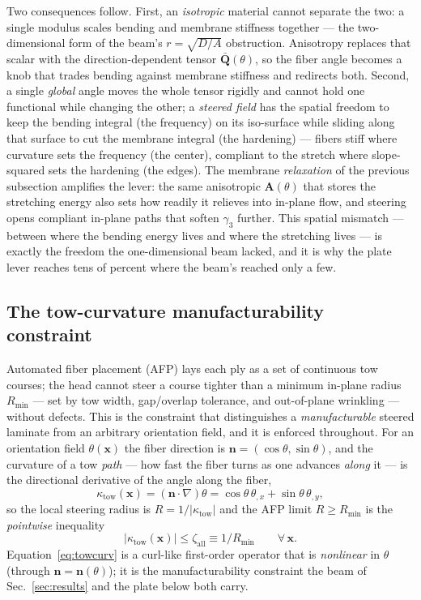 \documentclass[11pt]{article}
\newcommand{\zall}{\zeta_{\mathrm{all}}}
\begin{document}
Two consequences follow. First, an \emph{isotropic} material cannot separate the
two: a single modulus scales bending and membrane stiffness together --- the
two-dimensional form of the beam's $r=\sqrt{D/A}$ obstruction. Anisotropy
replaces that scalar with the direction-dependent tensor $\bar{\bm Q}(\theta)$,
so the fiber angle becomes a knob that trades bending against membrane stiffness
and redirects both. Second, a single \emph{global} angle moves the whole tensor
rigidly and cannot hold one functional while changing the other; a \emph{steered
field} has the spatial freedom to keep the bending integral (the frequency) on
its iso-surface while sliding along that surface to cut the membrane integral
(the hardening) --- fibers stiff where curvature sets the frequency (the center),
compliant to the stretch where slope-squared sets the hardening (the edges). The
membrane \emph{relaxation} of the previous subsection amplifies the lever: the
same anisotropic $\bm A(\theta)$ that stores the stretching energy also sets how
readily it relieves into in-plane flow, and steering opens compliant in-plane
paths that soften $\gamma_3$ further. This spatial mismatch --- between where the
bending energy lives and where the stretching lives --- is exactly the freedom the
one-dimensional beam lacked, and it is why the plate lever reaches tens of
percent where the beam's reached only a few.

\subsection{The tow-curvature manufacturability constraint}\label{sec:manuf}
Automated fiber placement (AFP) lays each ply as a set of continuous tow courses; the
head cannot steer a course tighter than a minimum in-plane radius $R_{\min}$ --- set by
tow width, gap/overlap tolerance, and out-of-plane wrinkling --- without defects. This
is the constraint that distinguishes a \emph{manufacturable} steered laminate from an
arbitrary orientation field, and it is enforced throughout. For an orientation field
$\theta(\bm x)$ the fiber direction is $\bm n=(\cos\theta,\sin\theta)$, and the curvature
of a tow \emph{path} --- how fast the fiber turns as one advances \emph{along} it --- is
the directional derivative of the angle along the fiber,
\begin{equation}
\kappa_{\mathrm{tow}}(\bm x)=(\bm n\!\cdot\!\nabla)\theta
=\cos\theta\,\theta_{,x}+\sin\theta\,\theta_{,y},
\label{eq:towcurv}
\end{equation}
so the local steering radius is $R=1/|\kappa_{\mathrm{tow}}|$ and the AFP limit
$R\ge R_{\min}$ is the \emph{pointwise} inequality
\begin{equation}
|\kappa_{\mathrm{tow}}(\bm x)|\le\zall\equiv 1/R_{\min}\qquad\forall\,\bm x .
\label{eq:curl}
\end{equation}
Equation~\eqref{eq:towcurv} is a curl-like first-order operator that is \emph{nonlinear}
in $\theta$ (through $\bm n=\bm n(\theta)$); it is the manufacturability constraint the
beam of Sec.~\ref{sec:results} and the plate below both carry.
\end{document}

